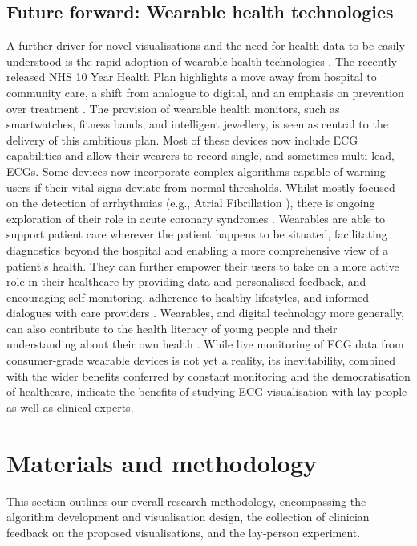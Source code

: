 \documentclass[
  10pt,
  letterpaper,
]{article}
\begin{document}
\subsection{Future forward: Wearable health
technologies}\label{future-forward-wearable-health-technologies}

A further driver for novel visualisations and the need for health data
to be easily understood is the rapid adoption of wearable health
technologies \citep{ma_making_2025, hicks_best_2019}. The recently
released NHS 10 Year Health Plan highlights a move away from hospital to
community care, a shift from analogue to digital, and an emphasis on
prevention over treatment \citep{dhsc_2025}. The provision of wearable
health monitors, such as smartwatches, fitness bands, and intelligent
jewellery, is seen as central to the delivery of this ambitious plan.
Most of these devices now include ECG capabilities and allow their
wearers to record single, and sometimes multi-lead, ECGs. Some devices
now incorporate complex algorithms capable of warning users if their
vital signs deviate from normal thresholds. Whilst mostly focused on the
detection of arrhythmias (e.g., Atrial Fibrillation
\citep{abdelrazik_2025}), there is ongoing exploration of their role in
acute coronary syndromes \citep{choi_2025, neri_2023}. Wearables are
able to support patient care wherever the patient happens to be
situated, facilitating diagnostics beyond the hospital and enabling a
more comprehensive view of a patient's health. They can further empower
their users to take on a more active role in their healthcare by
providing data and personalised feedback, and encouraging
self-monitoring, adherence to healthy lifestyles, and informed dialogues
with care providers \citep{ehizogie_2024}. Wearables, and digital
technology more generally, can also contribute to the health literacy of
young people and their understanding about their own health
\citep{goodyear_2019}. While live monitoring of ECG data from
consumer-grade wearable devices is not yet a reality, its inevitability,
combined with the wider benefits conferred by constant monitoring and
the democratisation of healthcare, indicate the benefits of studying ECG
visualisation with lay people as well as clinical experts.

\section{Materials and methodology}\label{materials-and-methodology}

This section outlines our overall research methodology, encompassing the
algorithm development and visualisation design, the collection of
clinician feedback on the proposed visualisations, and the lay‑person
experiment.
\end{document}
